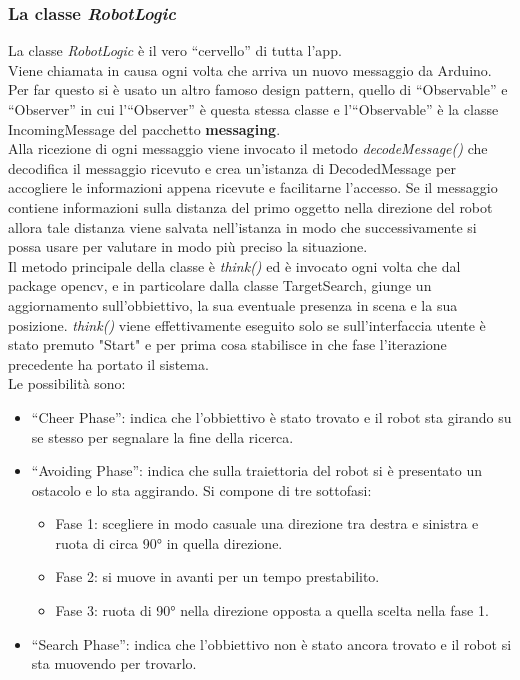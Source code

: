 \subsubsection{La classe \emph{RobotLogic}}
La classe \emph{RobotLogic} è il vero ``cervello'' di tutta l'app.\\
Viene chiamata in causa ogni volta che arriva un nuovo messaggio da Arduino. 
Per far questo si è usato un altro famoso design pattern, quello di ``Observable'' 
e ``Observer'' in cui l'``Observer'' è questa stessa classe e l'``Observable''
è la classe IncomingMessage del pacchetto \textbf{messaging}.\\
Alla ricezione di ogni messaggio viene invocato il metodo \emph{decodeMessage()}
che decodifica il messaggio ricevuto e crea un'istanza di DecodedMessage per 
accogliere le informazioni appena ricevute e facilitarne l'accesso. Se il messaggio
contiene informazioni sulla distanza del primo oggetto nella direzione del robot
allora tale distanza viene salvata nell'istanza in modo che successivamente si
possa usare per valutare in modo più preciso la situazione.\\
Il metodo principale della classe è \emph{think()} ed è invocato ogni volta che
dal package opencv, e in particolare dalla classe TargetSearch, giunge un aggiornamento
sull'obbiettivo, la sua eventuale presenza in scena e la sua posizione. \emph{think()}
viene effettivamente eseguito solo se sull'interfaccia utente è stato premuto "Start"
 e per prima cosa stabilisce in che fase l'iterazione precedente ha portato il sistema. \\
 Le possibilità sono:
	\begin{itemize}
	\item ``Cheer Phase'': indica che l'obbiettivo è stato trovato e il robot sta
	girando su se stesso per segnalare la fine della ricerca.
	\item ``Avoiding Phase'': indica che sulla traiettoria del robot si è presentato un ostacolo e lo sta aggirando. Si compone di tre sottofasi:
	\begin{itemize}
		\item Fase 1: scegliere in modo casuale una direzione tra destra e sinistra e ruota di circa 90° in quella direzione. 
		\item Fase 2: si muove in avanti per un tempo prestabilito.
		\item Fase 3: ruota di 90° nella direzione opposta a quella scelta nella fase 1.
	\end{itemize}
	\item ``Search Phase'': indica che l'obbiettivo non è stato ancora trovato e il robot si sta muovendo per trovarlo.
	\end{itemize}

